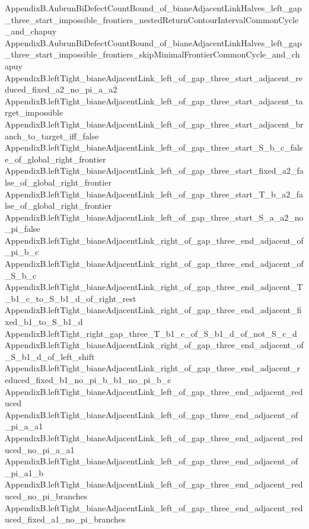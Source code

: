 \documentclass[
]{article}
\newenvironment{Shaded}{}{}
\newcommand{\NormalTok}[1]{#1}
\begin{document}
\begin{Shaded}
\begin{Highlighting}[]
\NormalTok{AppendixB.AubrunBiDefectCountBound\_of\_bianeAdjacentLinkHalves\_left\_gap\_three\_start\_impossible\_frontiers\_nestedReturnContourIntervalCommonCycle\_and\_chapuy}
\NormalTok{AppendixB.AubrunBiDefectCountBound\_of\_bianeAdjacentLinkHalves\_left\_gap\_three\_start\_impossible\_frontiers\_skipMinimalFrontierCommonCycle\_and\_chapuy}
\NormalTok{AppendixB.leftTight\_bianeAdjacentLink\_left\_of\_gap\_three\_start\_adjacent\_reduced\_fixed\_a2\_no\_pi\_a\_a2}
\NormalTok{AppendixB.leftTight\_bianeAdjacentLink\_left\_of\_gap\_three\_start\_adjacent\_target\_impossible}
\NormalTok{AppendixB.leftTight\_bianeAdjacentLink\_left\_of\_gap\_three\_start\_adjacent\_branch\_to\_target\_iff\_false}
\NormalTok{AppendixB.leftTight\_bianeAdjacentLink\_left\_of\_gap\_three\_start\_S\_b\_c\_false\_of\_global\_right\_frontier}
\NormalTok{AppendixB.leftTight\_bianeAdjacentLink\_left\_of\_gap\_three\_start\_fixed\_a2\_false\_of\_global\_right\_frontier}
\NormalTok{AppendixB.leftTight\_bianeAdjacentLink\_left\_of\_gap\_three\_start\_T\_b\_a2\_false\_of\_global\_right\_frontier}
\NormalTok{AppendixB.leftTight\_bianeAdjacentLink\_left\_of\_gap\_three\_start\_S\_a\_a2\_no\_pi\_false}
\NormalTok{AppendixB.leftTight\_bianeAdjacentLink\_right\_of\_gap\_three\_end\_adjacent\_of\_pi\_b\_c}
\NormalTok{AppendixB.leftTight\_bianeAdjacentLink\_right\_of\_gap\_three\_end\_adjacent\_of\_S\_b\_c}
\NormalTok{AppendixB.leftTight\_bianeAdjacentLink\_right\_of\_gap\_three\_end\_adjacent\_T\_b1\_c\_to\_S\_b1\_d\_of\_right\_rest}
\NormalTok{AppendixB.leftTight\_bianeAdjacentLink\_right\_of\_gap\_three\_end\_adjacent\_fixed\_b1\_to\_S\_b1\_d}
\NormalTok{AppendixB.leftTight\_right\_gap\_three\_T\_b1\_c\_of\_S\_b1\_d\_of\_not\_S\_c\_d}
\NormalTok{AppendixB.leftTight\_bianeAdjacentLink\_right\_of\_gap\_three\_end\_adjacent\_of\_S\_b1\_d\_of\_left\_shift}
\NormalTok{AppendixB.leftTight\_bianeAdjacentLink\_right\_of\_gap\_three\_end\_adjacent\_reduced\_fixed\_b1\_no\_pi\_b\_b1\_no\_pi\_b\_c}
\NormalTok{AppendixB.leftTight\_bianeAdjacentLink\_left\_of\_gap\_three\_end\_adjacent\_reduced}
\NormalTok{AppendixB.leftTight\_bianeAdjacentLink\_left\_of\_gap\_three\_end\_adjacent\_of\_pi\_a\_a1}
\NormalTok{AppendixB.leftTight\_bianeAdjacentLink\_left\_of\_gap\_three\_end\_adjacent\_reduced\_no\_pi\_a\_a1}
\NormalTok{AppendixB.leftTight\_bianeAdjacentLink\_left\_of\_gap\_three\_end\_adjacent\_of\_pi\_a1\_b}
\NormalTok{AppendixB.leftTight\_bianeAdjacentLink\_left\_of\_gap\_three\_end\_adjacent\_reduced\_no\_pi\_branches}
\NormalTok{AppendixB.leftTight\_bianeAdjacentLink\_left\_of\_gap\_three\_end\_adjacent\_reduced\_fixed\_a1\_no\_pi\_branches}
\end{Highlighting}
\end{Shaded}
\end{document}

